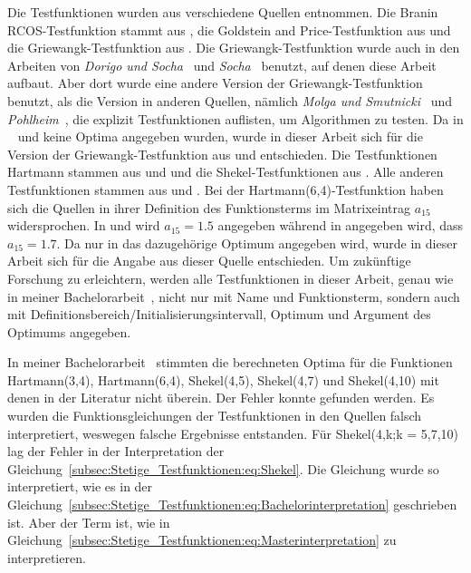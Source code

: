 \documentclass[fontsize=12, a4aper]{scrartcl}
\begin{document}
	Die Testfunktionen wurden aus verschiedene Quellen entnommen. Die Branin RCOS-Testfunktion stammt aus \cite{testFunctionBranin}, die Goldstein and Price-Testfunktion aus \cite{testFunctionGoldsteinandPrice} und die Griewangk-Testfunktion aus \cite{molga2005test}. Die Griewangk-Testfunktion wurde auch in den Arbeiten von \textit{Dorigo und Socha}~\cite{socha2008ant} und \textit{Socha}~\cite{socha2009ant} benutzt, auf denen diese Arbeit aufbaut. Aber dort wurde eine andere Version der Griewangk-Testfunktion benutzt, als die Version in anderen Quellen, nämlich \textit{Molga und Smutnicki}~\cite{molga2005test} und \textit{Pohlheim}~\cite{pohlheim2007examples}, die explizit Testfunktionen auflisten, um Algorithmen zu testen. Da in ~\cite{socha2008ant} und \cite{socha2009ant} keine Optima angegeben wurden, wurde in dieser Arbeit sich für die Version der Griewangk-Testfunktion aus \cite{pohlheim2007examples} und \cite{molga2005test} entschieden. Die Testfunktionen Hartmann stammen aus \cite{testFunctionHartmann3} und \cite{testFunctionHartmann6} und die Shekel-Testfunktionen aus \cite{testFunctionShekel}. Alle anderen Testfunktionen stammen aus \cite{socha2008ant} und \cite{socha2009ant}. Bei der Hartmann(6,4)-Testfunktion haben sich die Quellen in ihrer Definition des Funktionsterms im Matrixeintrag \(a_{15}\) widersprochen. In \cite{socha2008ant} und \cite{socha2009ant} wird \(a_{15} = 1.5\) angegeben während in \cite{testFunctionHartmann6} angegeben wird, dass \(a_{15} = 1.7\). Da nur in \cite{testFunctionHartmann6} das dazugehörige Optimum angegeben wird, wurde in dieser Arbeit sich für die Angabe aus dieser Quelle entschieden. Um zukünftige Forschung zu erleichtern, werden alle Testfunktionen in dieser Arbeit, genau wie in meiner Bachelorarbeit~\cite{FCM_2019}, nicht nur mit Name und Funktionsterm, sondern auch mit Definitionsbereich/Initialisierungsintervall, Optimum und Argument des Optimums angegeben.\hfill\newline
	
	In meiner Bachelorarbeit~\cite{FCM_2019} stimmten die berechneten Optima für die Funktionen Hartmann(3,4), Hartmann(6,4), Shekel(4,5), Shekel(4,7) und Shekel(4,10) mit denen in der Literatur nicht überein. Der Fehler konnte gefunden werden. Es wurden die Funktionsgleichungen der Testfunktionen in den Quellen falsch interpretiert, weswegen falsche Ergebnisse entstanden. Für Shekel(4,k;k = 5,7,10) lag der Fehler in der Interpretation der Gleichung~\ref{subsec:Stetige_Testfunktionen:eq:Shekel}. Die Gleichung wurde so interpretiert, wie es in der Gleichung~\ref{subsec:Stetige_Testfunktionen:eq:Bachelorinterpretation} geschrieben ist. Aber der Term ist, wie in Gleichung~\ref{subsec:Stetige_Testfunktionen:eq:Masterinterpretation} zu interpretieren.\hfill\newline
	
\end{document}
